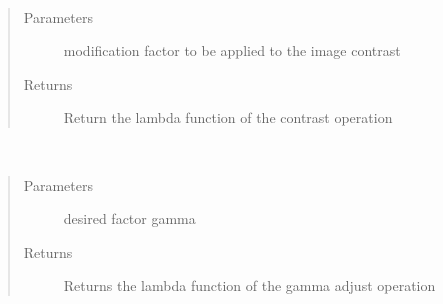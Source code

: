 \documentclass[letterpaper,10pt,english]{sphinxmanual}
\begin{document}

\begin{fulllineitems}
\label{\detokenize{ida_lib.operations:ida_lib.operations.pixel_ops_functional.get_contrast_function}}~\begin{quote}\begin{description}
\item[{Parameters}] \leavevmode
{} \textendash{} modification factor to be applied to the image contrast

\item[{Returns}] \leavevmode
Return the lambda function of the contrast operation

\end{description}\end{quote}

\end{fulllineitems}


\begin{fulllineitems}
\label{\detokenize{ida_lib.operations:ida_lib.operations.pixel_ops_functional.get_gamma_function}}~\begin{quote}\begin{description}
\item[{Parameters}] \leavevmode
{} \textendash{} desired factor gamma

\item[{Returns}] \leavevmode
Returns the lambda function of the gamma adjust operation

\end{description}\end{quote}

\end{fulllineitems}
\end{document}
